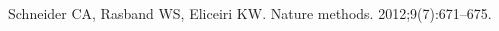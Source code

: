 \documentclass[runningheads]{llncs}
\begin{document}

\begin{thebibliography}{8}

Schneider CA, Rasband WS, Eliceiri KW.
\newblock Nature methods. 2012;9(7):671--675.

\end{thebibliography}
\end{document}
